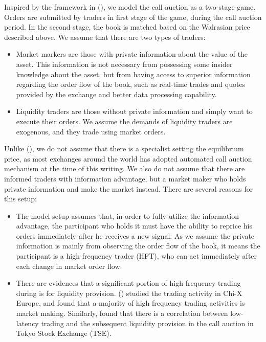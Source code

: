 \documentclass{article}
\begin{document}
Inspired by the framework in (\cite{Madhavan2015}), we model the call auction as a two-stage game. Orders are submitted by traders in first stage of the game, during the call auction period. In the second stage, the book is matched based on the Walrasian price described above. We assume that there are two types of traders:

\begin{itemize}
  \item Market markers are those with private information about the value of the asset. This information is not necessary from possessing some insider knowledge about the asset, but from having access to superior information regarding the order flow of the book, such as real-time trades and quotes provided by the exchange and better data processing capability.  
  \item Liquidity traders are those without private information and simply want to execute their orders. We assume the demands of liquidity traders are exogenous, and they trade using market orders.
\end{itemize}

Unlike (\cite{Madhavan2015}), we do not assume that there is a specialist setting the equilibrium price, as most exchanges around the world has adopted automated call auction mechanism at the time of this writing. We also do not assume that there are informed traders with information advantage, but a market maker who holds private information and make the market instead. There are several reasons for this setup:
\begin{itemize}
  \item The model setup assumes that, in order to fully utilize the information advantage, the participant who holds it must have the ability to reprice his orders immediately after he receives a new signal. As we assume the private information is mainly from observing the order flow of the book, it means the participant is a high frequency trader (HFT), who can act immediately after each change in market order flow.
  \item There are evidences that a significant portion of high frequency trading during is for liquidity provision. (\cite{Menkveld2013}) studied the trading activity in Chi-X Europe, and found that a majority of high frequency trading activities is market making. Similarly, \cite{Bellia2017} found that there is a correlation between low-latency trading and the subsequent liquidity provision in the call auction in Tokyo Stock Exchange (TSE).
\end{itemize}
\end{document}
